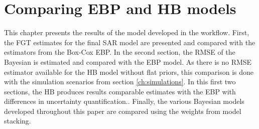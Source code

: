 \chapter{Comparing EBP and HB models}

This chapter presents the results of the model developed in the workflow.
First, the FGT estimates for the final SAR model are presented and compared with the estimators from the Box-Cox EBP.
In the second section, the RMSE of the Bayesian is estimated and compared with the EBP model.
As there is no RMSE estimator available for the HB model without flat priors, this comparison is done with the simulation scenarios from section \ref{ch:simulations}.
In this first two sections, the HB produces results comparable estimates with the EBP with differences in uncertainty quantification..
Finally, the various Bayesian models developed throughout this paper are compared using the weights from model stacking.









